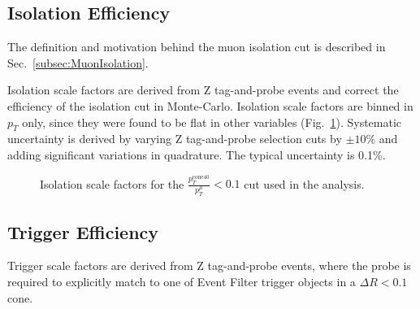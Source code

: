 
\subsection{Isolation Efficiency}

The definition and motivation behind the muon isolation cut is described in Sec.~\ref{subsec:MuonIsolation}.

Isolation scale factors are derived from Z tag-and-probe events and correct the efficiency of the isolation cut in Monte-Carlo. Isolation scale factors are binned in $p_T$ only, since they were found to be flat in other variables (Fig.~\ref{fig:perf:isosf}). Systematic uncertainty is derived by varying Z tag-and-probe selection cuts by $\pm 10\%$ and adding significant variations in quadrature. The typical uncertainty is 0.1\%.

\begin{figure}[phtb]
  \begin{center}
 \caption{ Isolation scale factors for the $\frac{p_T^\mathrm{cone40}}{p_T^{\mu}} < 0.1$ cut used in the analysis.}
 \label{fig:perf:isosf}
 \end{center}
\end{figure}

\subsection{Trigger Efficiency}
Trigger scale factors are derived from Z tag-and-probe events, where the probe is required to explicitly match to one of Event Filter trigger objects in a $\Delta R < 0.1$ cone.

